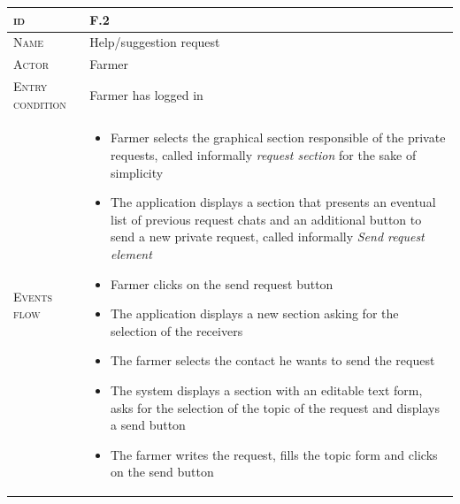 
\begin{table}[H]
    \centering
    \begin{tabular}{|l|p{}|}
        \hline %
    	\textsc{id}                 &   F.2\\
    	\hline %
    	\textsc{Name}               &   Help/suggestion request\\
    	\hline %
    	\textsc{Actor}             &   Farmer\\
    	\hline %
    	\textsc{Entry condition}   &   Farmer has logged in\\
    	\hline %
    	\textsc{Events flow}         &   %
            	                        \begin{itemize}
                                    	    \item Farmer selects the graphical section responsible of the private requests, called informally \textit{request section} for the sake of simplicity
                                    		\item The application displays a section that presents an eventual list of previous request chats and an additional button to send a new private request, called informally \textit{Send request element}
                                    		\item Farmer clicks on the send request button
                                    		\item The application displays a new section asking for the selection of the receivers
                                    		\item The farmer selects the contact he wants to send the request
                                    		\item The system displays a section with an editable text form, asks for the selection of the topic of the request and displays a send button
                                    		\item The farmer writes the request, fills the topic form and clicks on the send button
                                        \end{itemize}\\

\end{tabular}
\end{table}
